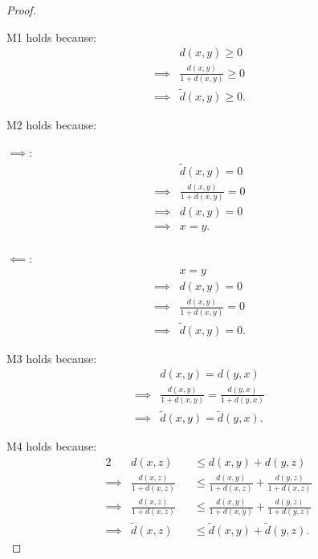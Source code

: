 \documentclass{article}
\begin{document}
\begin{proof}
  $ $

  M1 holds because: 
  \begin{align*}
    &d(x,y) \geq 0 &&\\
    \implies& \frac{d(x,y)}{1+d(x,y)} \geq 0 &&\\
    \implies& \tilde{d}(x,y) \geq 0.
  \end{align*}

  M2 holds because:

  \textbf{\underline{$\implies$}}:
  \begin{align*}
    &\tilde{d}(x,y) = 0 &&\\
    \implies& \frac{d(x,y)}{1+d(x,y)} = 0 &&\\
    \implies& d(x,y) = 0 &&\\
    \implies& x = y. &&\\
  \end{align*}

  \textbf{\underline{$\impliedby$}}:
  \begin{align*}
    &x = y &&\\
    \implies& d(x,y) = 0 &&\\
    \implies& \frac{d(x,y)}{1 + d(x,y)} = 0 &&\\
    \implies& \tilde{d}(x,y) = 0.
  \end{align*}

  M3 holds because: 
  \begin{align*}
    &d(x,y) = d(y,x) &&\\
    \implies& \frac{d(x,y)}{1+d(x,y)} = \frac{d(y,x)}{1+d(y,x)} &&\\
    \implies& \tilde{d}(x,y) = \tilde{d}(y,x).
  \end{align*}

  M4 holds because:
  \begin{alignat*}{2}
    &d(x,z) &&\leq d(x,y) + d(y,z) \\
    \implies& \frac{d(x,z)}{1+d(x,z)} &&\leq \frac{d(x,y)}{1+d(x,z)} + \frac{d(y,z)}{1 + d(x, z)} \\
    \implies& \frac{d(x,z)}{1+d(x,z)} &&\leq \frac{d(x,y)}{1+d(x,y)} + \frac{d(y,z)}{1 + d(y,z)} \\
    \implies& \tilde{d}(x,z) &&\leq \tilde{d}(x,y) + \tilde{d}(y,z).
  \end{alignat*}
\end{proof}

\newpage
\end{document}
